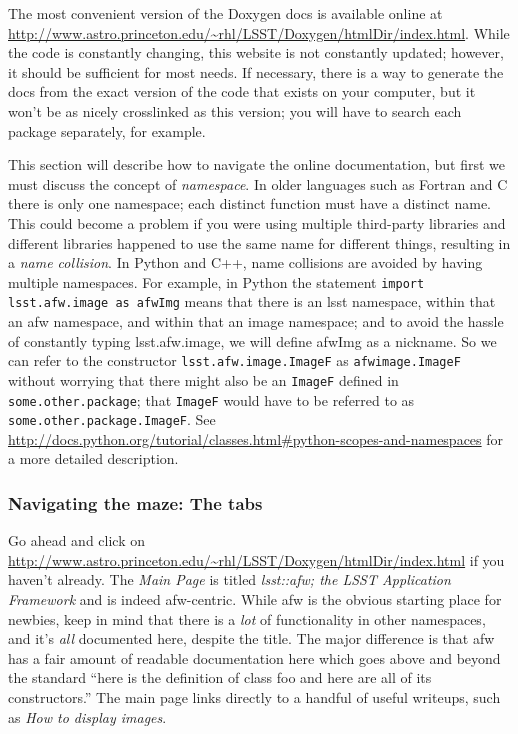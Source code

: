 \documentclass{book}
\begin{document}
The most convenient version of the Doxygen docs is available online at
\url{http://www.astro.princeton.edu/~rhl/LSST/Doxygen/htmlDir/index.html}.
While the code is constantly changing, this website is not constantly
updated; however, it should be sufficient for most needs.  If necessary,
there is a way to generate the docs from the exact version of the code that
exists on your computer, but it won't be as nicely crosslinked as this
version; you will have to search each package separately, for example.

This section will describe how to navigate the online documentation,
but first we must discuss the concept of {\it namespace}.  In older
languages such as Fortran and C there is only one namespace; each
distinct function must have a distinct name.  This could become a
problem if you were using multiple third-party libraries and different
libraries happened to use the same name for different things,
resulting in a {\it name collision}.  In Python and C++, name
collisions are avoided by having multiple namespaces.  For example, in
Python the statement \texttt{import lsst.afw.image as afwImg} means
that there is an lsst namespace, within that an afw namespace, and
within that an image namespace; and to avoid the hassle of constantly
typing lsst.afw.image, we will define afwImg as a nickname.  So we can
refer to the constructor \texttt{lsst.afw.image.ImageF} as \texttt{afwimage.ImageF}
without worrying that there might also be an \texttt{ImageF} defined
in \texttt{some.other.package}; that \texttt{ImageF} would have to be
referred to as \texttt{some.other.package.ImageF}.  See
\url{http://docs.python.org/tutorial/classes.html#python-scopes-and-namespaces}
for a more detailed description.


\subsubsection{Navigating the maze:  The tabs}

Go ahead and click on
\url{http://www.astro.princeton.edu/~rhl/LSST/Doxygen/htmlDir/index.html}
if you haven't already.  The {\it Main Page} is titled {\it lsst::afw; the
LSST Application Framework} and is indeed afw-centric.  While afw is
the obvious starting place for newbies, keep in mind that there is a
{\it lot} of functionality in other namespaces, and it's {\it all}
documented here, despite the title.  The major difference is that afw
has a fair amount of readable documentation here which goes above and
beyond the standard ``here is the definition of class foo and here are
all of its constructors.''  The main page links directly to a handful
of useful writeups, such as {\it How to display images}.
\end{document}
